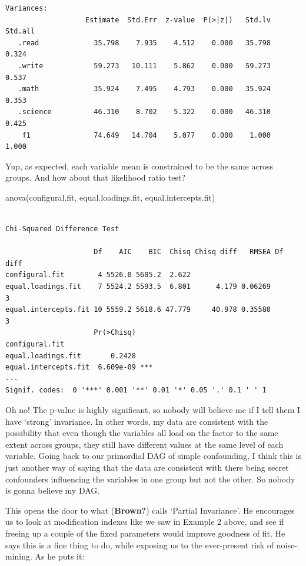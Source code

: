 \documentclass[
  letterpaper,
  DIV=11,
  numbers=noendperiod]{scrreprt}
\newenvironment{Shaded}{\begin{snugshade}}{\end{snugshade}}
\newcommand{\FunctionTok}[1]{\textcolor[rgb]{0.28,0.35,0.67}{#1}}
\newcommand{\NormalTok}[1]{\textcolor[rgb]{0.00,0.23,0.31}{#1}}
\begin{document}
\begin{verbatim}
Variances:
                   Estimate  Std.Err  z-value  P(>|z|)   Std.lv  Std.all
   .read             35.798    7.935    4.512    0.000   35.798    0.324
   .write            59.273   10.111    5.862    0.000   59.273    0.537
   .math             35.924    7.495    4.793    0.000   35.924    0.353
   .science          46.310    8.702    5.322    0.000   46.310    0.425
    f1               74.649   14.704    5.077    0.000    1.000    1.000
\end{verbatim}

Yup, as expected, each variable mean is constrained to be the same
across groups. And how about that likelihood ratio test?

\begin{Shaded}
\begin{Highlighting}[]
\FunctionTok{anova}\NormalTok{(configural.fit, equal.loadings.fit, equal.intercepts.fit)}
\end{Highlighting}
\end{Shaded}

\begin{verbatim}

Chi-Squared Difference Test

                     Df    AIC    BIC  Chisq Chisq diff   RMSEA Df diff
configural.fit        4 5526.0 5605.2  2.622                           
equal.loadings.fit    7 5524.2 5593.5  6.801      4.179 0.06269       3
equal.intercepts.fit 10 5559.2 5618.6 47.779     40.978 0.35580       3
                     Pr(>Chisq)    
configural.fit                     
equal.loadings.fit       0.2428    
equal.intercepts.fit  6.609e-09 ***
---
Signif. codes:  0 '***' 0.001 '**' 0.01 '*' 0.05 '.' 0.1 ' ' 1
\end{verbatim}

Oh no! The p-value is highly significant, so nobody will believe me if I
tell them I have `strong' invariance. In other words, my data are
consistent with the possibility that even though the variables all load
on the factor to the same extent across groups, they still have
different values at the same level of each variable. Going back to our
primordial DAG of simple confounding, I think this is just another way
of saying that the data are consistent with there being secret
confounders influencing the variables in one group but not the other. So
nobody is gonna believe my DAG.

This opens the door to what (\textbf{Brown?}) calls `Partial
Invariance'. He encourages us to look at modification indexes like we
saw in Example 2 above, and see if freeing up a couple of the fixed
parameters would improve goodness of fit. He says this is a fine thing
to do, while exposing us to the ever-present risk of noise-mining. As he
puts it:
\end{document}
